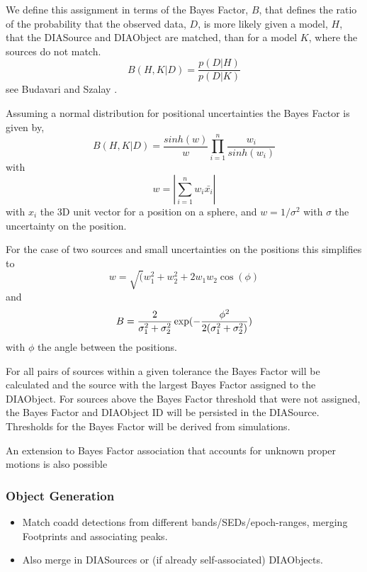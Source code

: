 We define this assignment in terms of the Bayes Factor, $B$, that defines
the ratio of the probability that the observed data, $D$, is more
likely given a model, $H$, that the DIASource and DIAObject are
matched, than for a model $K$, where the sources do not match. 
\begin{equation}
B(H,K|D) = \frac{p(D|H)}{p(D|K)}
\end{equation}
see Budavari and Szalay \cite{budavariSzalay2008}.

Assuming a normal distribution for positional uncertainties the Bayes
Factor is given by, 
\begin{equation} 
B(H,K|D) = \frac{sinh (w)}{w} \prod_{i=1}^n \frac{w_i}{sinh (w_i)}
\end{equation} 
with 
\begin{equation}
w = |\sum_{i=1}^n w_i \bar{x_i} |
\end{equation}
with $x_i$ the 3D unit vector for a position on a sphere, and
$w=1/\sigma^2$ with $\sigma$ the uncertainty on the position.

For the case of two sources and small uncertainties on the positions this simplifies to 
\begin{equation}
w = \sqrt(w_1^2 + w_2^2 +2 w_1 w_2 \cos(\phi)
\end{equation}
and
\begin{equation}
B=\frac{2}{\sigma_1^2 + \sigma_2^2} \, {\rm exp}(-\frac{\phi^2}{2(\sigma_1^2 + \sigma_2^2)})
\end{equation}
with $\phi$ the angle between the positions.

For all pairs of sources within a given tolerance the Bayes Factor
will be calculated and the source with the largest Bayes Factor
assigned to the DIAObject. For sources above the Bayes Factor
threshold that were not assigned, the Bayes Factor and DIAObject ID
will be persisted in the DIASource. Thresholds for the Bayes Factor
will be derived from simulations.

An extension to Bayes Factor association that accounts for unknown
proper motions is also possible \citep{???}


\subsubsection{Object Generation}
\label{sec:acObjectGeneration}
\begin{itemize}
\item Match coadd detections from different bands/SEDs/epoch-ranges, merging Footprints and associating peaks.
\item Also merge in DIASources or (if already self-associated) DIAObjects.
\end{itemize}

